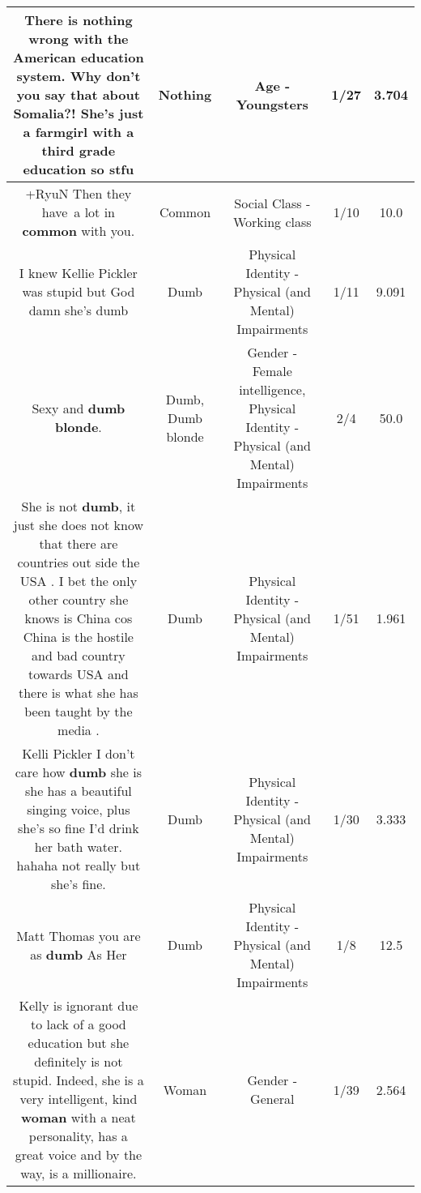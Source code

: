 \documentclass[11pt]{article}
\newlength\mylength
\begin{document}
\begin{center}
\begin{longtable}{|C{.65\mylength}|C{.30\mylength}|C{.12\mylength}|C{.12\mylength}|C{.12\mylength}|}
  \small There is \textbf{nothing} wrong with the American education system. Why don't you say that about Somalia?! She's just a farmgirl with a third grade education so stfu\normalsize   & Nothing & Age - Youngsters & 1/27 & 3.704 \\  \hline
  \small +RyuN Then they have a lot in \textbf{common} with you.\normalsize   & Common & Social Class - Working class & 1/10 & 10.0 \\  \hline
  \small I knew Kellie Pickler was stupid but God damn she's dumb\normalsize   & Dumb & Physical Identity - Physical (and Mental) Impairments & 1/11 & 9.091 \\  \hline
  \small Sexy and \textbf{d\textbf{umb} blonde}.\normalsize   & Dumb, Dumb blonde & Gender - Female intelligence, Physical Identity - Physical (and Mental) Impairments & 2/4 & 50.0 \\  \hline
  \small She is not \textbf{dumb}, it just she does not know that  there are countries out side the USA . I bet the  only other country she knows is China cos China is the  hostile and bad country towards USA and there is what she has been taught by the media .\normalsize   & Dumb & Physical Identity - Physical (and Mental) Impairments & 1/51 & 1.961 \\  \hline
  \small Kelli Pickler I don't care how \textbf{dumb} she is she has a beautiful singing voice, plus she's so fine I'd drink her bath water. hahaha not really but she's fine.\normalsize   & Dumb & Physical Identity - Physical (and Mental) Impairments & 1/30 & 3.333 \\  \hline
  \small Matt Thomas you are as \textbf{dumb} As Her\normalsize   & Dumb & Physical Identity - Physical (and Mental) Impairments & 1/8 & 12.5 \\  \hline
  \small Kelly is ignorant due to lack of a good education but she definitely is not stupid. Indeed, she is a very intelligent, kind \textbf{woman} with a neat personality, has a great voice and by the way, is a millionaire.\normalsize   & Woman & Gender - General & 1/39 & 2.564 \\  \hline

\end{longtable}
\end{center}
\end{document}
